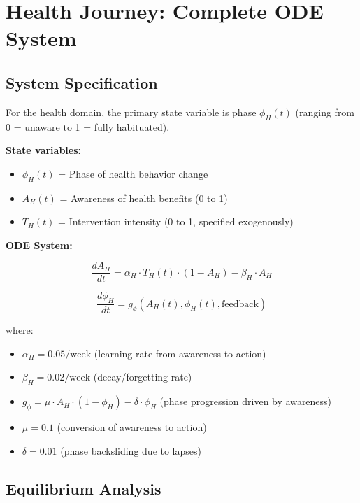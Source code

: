 \section{Health Journey: Complete ODE System}
\label{ooo:health}

\subsection{System Specification}

For the health domain, the primary state variable is phase $\phi_H(t)$ (ranging from 0 = unaware to 1 = fully habituated).

\textbf{State variables:}
\begin{itemize}[nosep]
\item $\phi_H(t)$ = Phase of health behavior change
\item $A_H(t)$ = Awareness of health benefits (0 to 1)
\item $T_H(t)$ = Intervention intensity (0 to 1, specified exogenously)
\end{itemize}

\textbf{ODE System:}

\begin{equation}
\frac{dA_H}{dt} = \alpha_H \cdot T_H(t) \cdot (1 - A_H) - \beta_H \cdot A_H
\label{eq:health-awareness}
\end{equation}

\begin{equation}
\frac{d\phi_H}{dt} = g_\phi(A_H(t), \phi_H(t), \text{feedback})
\label{eq:health-phase}
\end{equation}

where:
\begin{itemize}[nosep]
\item $\alpha_H = 0.05 / \text{week}$ (learning rate from awareness to action)
\item $\beta_H = 0.02 / \text{week}$ (decay/forgetting rate)
\item $g_\phi = \mu \cdot A_H \cdot (1 - \phi_H) - \delta \cdot \phi_H$ (phase progression driven by awareness)
\item $\mu = 0.1$ (conversion of awareness to action)
\item $\delta = 0.01$ (phase backsliding due to lapses)
\end{itemize}

\subsection{Equilibrium Analysis}

